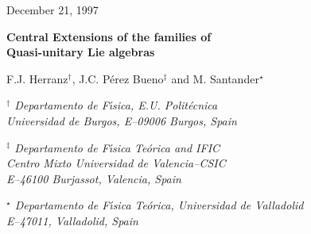 \documentclass[12pt]{article}
\begin{document}
\thispagestyle{empty}

\hfill December 21, 1997
\bigskip\bigskip

\begin{center}

{\LARGE{\bf{Central Extensions of the families of
\\[0.3cm]
Quasi-unitary Lie algebras}}}
\end{center}

\bigskip

\begin{center}
F.J. Herranz$^\dagger$,
J.C. P\'erez Bueno$^\ddagger$
and M. Santander$^\star$
\end{center}

\begin{center}
{\it $^\dagger$ Departamento de F\'{\i}sica, E.U. Polit\'ecnica \\
Universidad de Burgos, E--09006 Burgos, Spain}
\end{center}

\begin{center}
{\it $^\ddagger$ Departamento de F\'{\i}sica Te\'orica and IFIC \\
Centro Mixto Universidad de Valencia--CSIC \\
E--46100 Burjassot, Valencia, Spain}
\end{center}

\begin{center}
{\it $^{\star}$ Departamento de F\'{\i}sica Te\'orica,
Universidad de Valladolid \\
E--47011, Valladolid, Spain}
\end{center}

\begin{abstract}
The most general possible central extensions of two whole families of  Lie
algebras, which can be obtained by contracting the special pseudo-unitary
algebras $su({p,q})$ of the  Cartan series $A_l$ and the pseudo-unitary
algebras
$u({p,q})$, are completely determined and classified for arbitrary $p,\ q$.
In addition to the $su({p,q})$ and $u({p,q})$ algebras, whose second cohomology
group is well known to be trivial, each family includes many non-semisimple
algebras; their central extensions, which are explicitly given, can be
classified into three types as far as their properties under contraction are
involved. A  closed expression for the dimension of the second cohomology group
of any member of these families of algebras is given.
\end{abstract}
\end{document}

